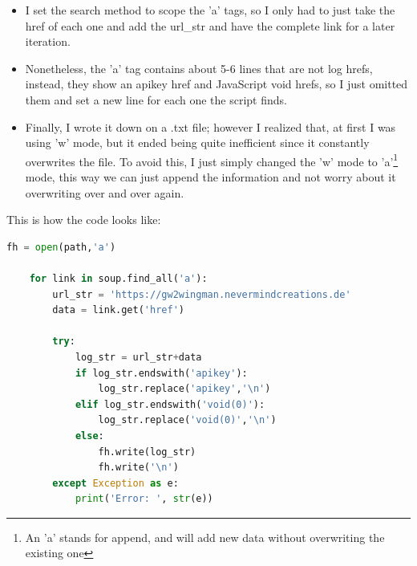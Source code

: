 \documentclass[12pt,a4paper]{article}
\begin{document}
    \begin{itemize}

        \item I set the search method to scope the 'a' tags, so I only had to just take the href of each one and 
        add the url\_str and have the complete link for a later iteration.

        \item Nonetheless, the 'a' tag contains about 5-6 lines that are not log hrefs, instead, they show an apikey 
        href and JavaScript void hrefs, so I just omitted them and set a new line for each one the script finds.

        \newpage

        \item Finally, I wrote it down on a .txt file; however I realized that, at first I was using 'w' mode, but it 
        ended being quite inefficient since it constantly overwrites the file. To avoid this, I just simply changed 
        the 'w' mode to 'a'\footnote{An 'a' stands for append, and will add new data without overwriting the existing one}
        mode, this way we can just append the information and not worry about it overwriting over and over again.

    \end{itemize}

    This is how the code looks like:

    \begin{lstlisting}[language=Python]
    fh = open(path,'a')

    for link in soup.find_all('a'):
        url_str = 'https://gw2wingman.nevermindcreations.de'
        data = link.get('href')
        
        try:
            log_str = url_str+data
            if log_str.endswith('apikey'):
                log_str.replace('apikey','\n')
            elif log_str.endswith('void(0)'):
                log_str.replace('void(0)','\n')
            else:
                fh.write(log_str)
                fh.write('\n')
        except Exception as e:
            print('Error: ', str(e))
    \end{lstlisting}
\end{document}
